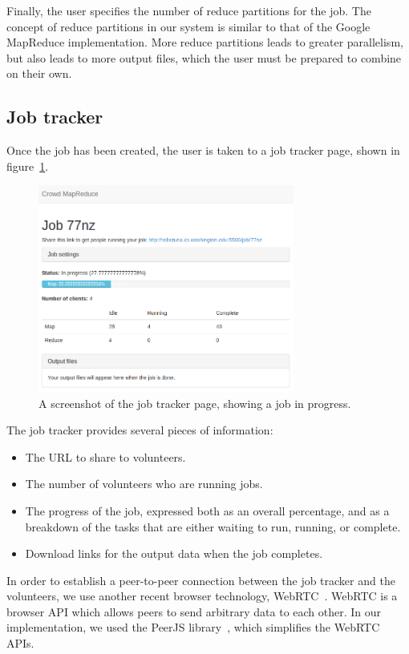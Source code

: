 \documentclass{article} %
\begin{document}
Finally, the user specifies the number of reduce partitions for the job. The
concept of reduce partitions in our system is similar to that of the Google
MapReduce implementation. More reduce partitions leads to greater parallelism,
but also leads to more output files, which the user must be prepared to combine
on their own.

\subsection{Job tracker}
Once the job has been created, the user is taken to a job tracker page, shown in
figure~\ref{maprunning}.

\begin{figure}[h]
  \centering
    \includegraphics[width=0.75\textwidth]{maprunning}
    \caption{A screenshot of the job tracker page, showing a job in progress.}
    \label{maprunning}
\end{figure}

The job tracker provides several pieces of information:
\begin{itemize}
  \item The URL to share to volunteers.
  \item The number of volunteers who are running jobs.
  \item The progress of the job, expressed both as an overall percentage, and as
  a breakdown of the tasks that are either waiting to run, running, or complete.
  \item Download links for the output data when the job completes.
\end{itemize}

In order to establish a peer-to-peer connection between the job tracker and the
volunteers, we use another recent browser technology, WebRTC~\cite{webrtc}.
WebRTC is a browser API which allows peers to send arbitrary data to each other.
In our implementation, we used the PeerJS library~\cite{peerjs}, which
simplifies the WebRTC APIs.
\end{document}
